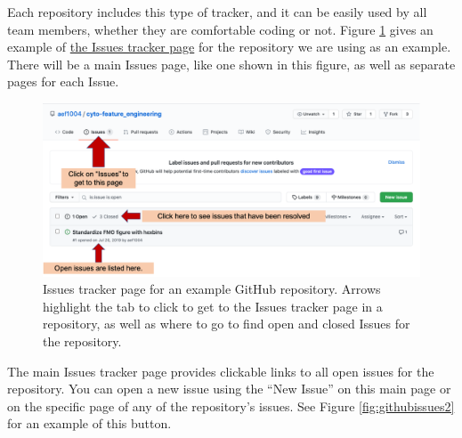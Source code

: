 \documentclass[]{tufte-book}
\begin{document}
Each repository includes this type of tracker, and it can be easily used by all
team members, whether they are comfortable coding or not. Figure
\ref{fig:githubissues1} gives an example of \href{https://github.com/aef1004/cyto-feature_engineering/issues}{the Issues tracker
page} for the
repository we are using as an example. There will be a main Issues page, like
one shown in this figure, as well as separate pages for each Issue.

\begin{figure}
\includegraphics[width=\textwidth]{figures/github_issues} \caption[Issues tracker page for an example GitHub repository]{Issues tracker page for an example GitHub repository. Arrows highlight the tab to click to get to the Issues tracker page in a repository, as well as where to go to find open and closed Issues for the repository.}\label{fig:githubissues1}
\end{figure}

The main Issues tracker page provides clickable links to all open issues for
the repository. You can open a new issue using the ``New Issue'' on this main
page or on the specific page of any of the repository's issues. See Figure
\ref{fig:githubissues2} for an example of this button.
\end{document}
